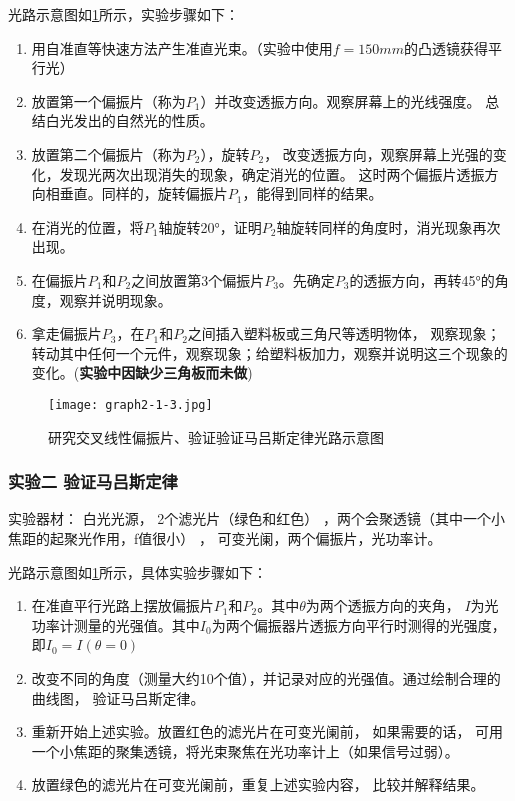 \documentclass[dvipsnames, svgnames,a4paper,11pt]{article}
\begin{document}
	光路示意图如\cref{fig:graph2-1-3}所示，实验步骤如下：
	\begin{enumerate}
		\item 用自准直等快速方法产生准直光束。（实验中使用$f=150mm$的凸透镜获得平行光）
		\item 放置第一个偏振片（称为$P_1$）并改变透振方向。观察屏幕上的光线强度。 总结白光发出的自然光的性质。

		\item 放置第二个偏振片（称为$P_2$），旋转$P_2$， 改变透振方向，观察屏幕上光强的变化，发现光两次出现消失的现象，确定消光的位置。 这时两个偏振片透振方向相垂直。同样的，旋转偏振片$P_1$，能得到同样的结果。
		\item 在消光的位置，将$P_1$轴旋转20°，证明$P_2$轴旋转同样的角度时，消光现象再次出现。
		\item 在偏振片$P_1$和$P_2$之间放置第3个偏振片$P_3$。先确定$P_3$的透振方向，再转45°的角度，观察并说明现象。
		\item 拿走偏振片$P_3$，在$P_1$和$P_2$之间插入塑料板或三角尺等透明物体， 观察现象；转动其中任何一个元件，观察现象；给塑料板加力，观察并说明这三个现象的变化。(\textbf{实验中因缺少三角板而未做})

	\end{enumerate}

	\begin{figure}[htbp]
		\centering
		\texttt{[image: graph2-1-3.jpg]}
		\caption{研究交叉线性偏振片、验证验证马吕斯定律光路示意图}
		\label{fig:graph2-1-3}
	\end{figure}


	\subsubsection{实验二 \quad 验证马吕斯定律}

	实验器材： 白光光源， 2个滤光片（绿色和红色） ，两个会聚透镜（其中一个小焦距的起聚光作用，f值很小） ， 可变光阑，两个偏振片，光功率计。

	光路示意图如\cref{fig:graph2-1-3}所示，具体实验步骤如下：
	\begin{enumerate}
		\item 在准直平行光路上摆放偏振片$P_1$和$P_2$。其中$\theta$为两个透振方向的夹角， $I$为光功率计测量的光强值。其中$I_0$为两个偏振器片透振方向平行时测得的光强度，即$I_0=I(\theta=0)$
		\item 改变不同的角度（测量大约10个值），并记录对应的光强值。通过绘制合理的曲线图， 验证马吕斯定律。
		\item 重新开始上述实验。放置红色的滤光片在可变光阑前， 如果需要的话， 可用一个小焦距的聚集透镜，将光束聚焦在光功率计上（如果信号过弱）。
		\item 放置绿色的滤光片在可变光阑前，重复上述实验内容， 比较并解释结果。
	\end{enumerate}
\end{document}
